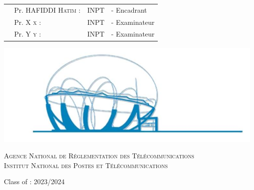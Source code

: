 \begin{center}
\begin{tabular}{p{1cm}lll}
  & \large Pr. HAFIDDI \textsc{Hatim} : & \large INPT & \large - Encadrant \\[0.1cm]
  & \large Pr. X \textsc{x} : & \large INPT & \large - Examinateur \\[0.1cm]
  
  & \large Pr. Y \textsc{y} : & \large INPT & \large - Examinateur  \\[0.1cm]
 
\end{tabular}

\includegraphics[scale=0.5]{Logos/ZLAFA.png}


\textsc{Agence National de Réglementation des Télécommunications}\\
\textsc{Institut National des Postes et Télécommunications}

{\large Class of : 2023/2024}
   
\end{center}


